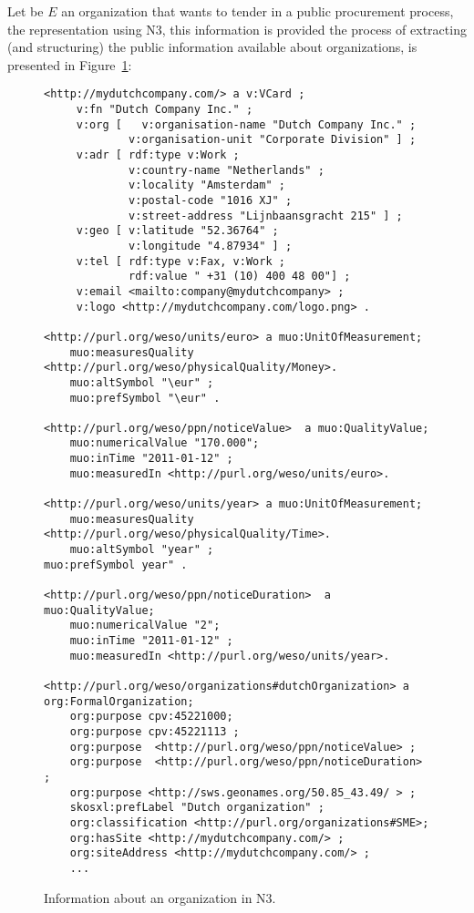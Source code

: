 \documentclass{llncs}
\begin{document}
Let be $E$ an organization that wants to tender in a public procurement process, 
the representation using N3, this information is provided the process of extracting (and structuring) 
the public information available about organizations, is presented in Figure~\ref{figure:org}:

\begin{figure}[p]
\begin{center}
\begin{lstlisting}[language=SPARQL]
 <http://mydutchcompany.com/> a v:VCard ;
     v:fn "Dutch Company Inc." ;
     v:org [   v:organisation-name "Dutch Company Inc." ;
             v:organisation-unit "Corporate Division" ] ;
     v:adr [ rdf:type v:Work ;
             v:country-name "Netherlands" ;
             v:locality "Amsterdam" ;
             v:postal-code "1016 XJ" ;
             v:street-address "Lijnbaansgracht 215" ] ;
     v:geo [ v:latitude "52.36764" ;
             v:longitude "4.87934" ] ;
     v:tel [ rdf:type v:Fax, v:Work ;
             rdf:value " +31 (10) 400 48 00"] ; 
     v:email <mailto:company@mydutchcompany> ;
     v:logo <http://mydutchcompany.com/logo.png> .

<http://purl.org/weso/units/euro> a muo:UnitOfMeasurement;
    muo:measuresQuality <http://purl.org/weso/physicalQuality/Money>.
    muo:altSymbol "\eur" ;
    muo:prefSymbol "\eur" .

<http://purl.org/weso/ppn/noticeValue>  a muo:QualityValue;
    muo:numericalValue "170.000";
    muo:inTime "2011-01-12" ;
    muo:measuredIn <http://purl.org/weso/units/euro>.

<http://purl.org/weso/units/year> a muo:UnitOfMeasurement;
    muo:measuresQuality <http://purl.org/weso/physicalQuality/Time>.
    muo:altSymbol "year" ;
muo:prefSymbol year" .

<http://purl.org/weso/ppn/noticeDuration>  a muo:QualityValue;
    muo:numericalValue "2";
    muo:inTime "2011-01-12" ;
    muo:measuredIn <http://purl.org/weso/units/year>.

<http://purl.org/weso/organizations#dutchOrganization> a org:FormalOrganization;
    org:purpose cpv:45221000;
    org:purpose cpv:45221113 ; 
    org:purpose  <http://purl.org/weso/ppn/noticeValue> ; 
    org:purpose  <http://purl.org/weso/ppn/noticeDuration> ; 
    org:purpose <http://sws.geonames.org/50.85_43.49/ > ;
    skosxl:prefLabel "Dutch organization" ;
    org:classification <http://purl.org/organizations#SME>;
    org:hasSite <http://mydutchcompany.com/> ;
    org:siteAddress <http://mydutchcompany.com/> ;
    ... 
\end{lstlisting}
\caption{Information about an organization in N3.}
\label{figure:org}
\end{center}
\end{figure}
\end{document}
